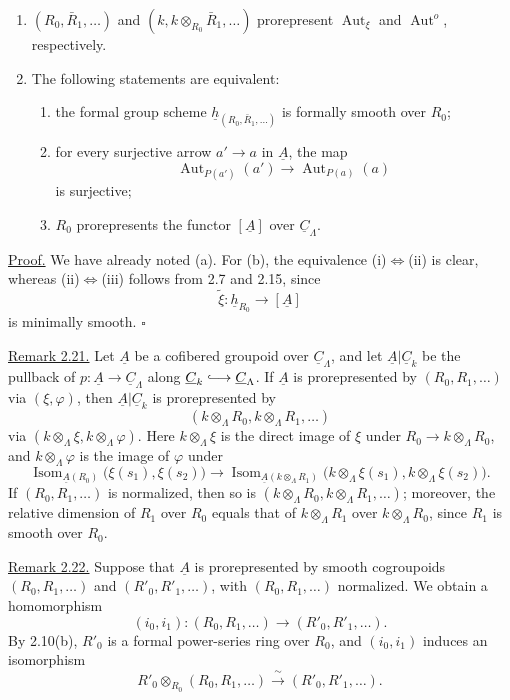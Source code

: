 \begin{enumerate}[label=(\alph*)]
\item $(R_0,\bar R_1,\ldots)$ and
$(k,k\otimes_{R_0}\bar R_1,\ldots)$ prorepresent
$\operatorname{Aut}_\xi$ and $\operatorname{Aut}^{o}$, respectively.

\item The following statements are equivalent:
\begin{enumerate}[label=(\roman*)]
\item the formal group scheme
$\underline h_{(R_0,\bar R_1,\ldots)}$ is formally smooth over $R_0$;
\item for every surjective arrow $a'\longrightarrow a$ in
$\underline A$, the map
\[
 \operatorname{Aut}_{P(a')}(a')\longrightarrow
 \operatorname{Aut}_{P(a)}(a)
\]
is surjective;
\item $R_0$ prorepresents the functor $[\underline A]$ over
$\underline C_\Lambda$.
\end{enumerate}
\end{enumerate}


\underline{Proof.} We have already noted (a). For (b), the
equivalence (i)$\Leftrightarrow$(ii) is clear, whereas
(ii)$\Leftrightarrow$(iii) follows from 2.7 and 2.15, since
\[
 \widetilde\xi:\underline h_{R_0}\longrightarrow[\underline A]
\]
is minimally smooth. \hfill$\square$

\underline{Remark 2.21.} Let $\underline A$ be a cofibered groupoid
over $\underline C_\Lambda$, and let
$\underline A|\underline C_k$ be the pullback of
$p:\underline A\longrightarrow\underline C_\Lambda$ along
$\underline C_k\lhook\joinrel\longrightarrow\underline C_\Lambda$.
If $\underline A$ is prorepresented by $(R_0,R_1,\ldots)$ via
$(\xi,\varphi)$, then $\underline A|\underline C_k$ is
prorepresented by
\[
 (k\otimes_\Lambda R_0,k\otimes_\Lambda R_1,\ldots)
\]
via $(k\otimes_\Lambda\xi,k\otimes_\Lambda\varphi)$. Here
$k\otimes_\Lambda\xi$ is the direct image of $\xi$ under
$R_0\longrightarrow k\otimes_\Lambda R_0$, and
$k\otimes_\Lambda\varphi$ is the image of $\varphi$ under
\[
 \operatorname{Isom}_{\underline A(R_0)}
   \bigl(\xi(s_1),\xi(s_2)\bigr)
 \longrightarrow
 \operatorname{Isom}_{\underline A(k\otimes_\Lambda R_1)}
   \bigl(k\otimes_\Lambda\xi(s_1),
         k\otimes_\Lambda\xi(s_2)\bigr).
\]
If $(R_0,R_1,\ldots)$ is normalized, then so is
$(k\otimes_\Lambda R_0,k\otimes_\Lambda R_1,\ldots)$; moreover, the
relative dimension of $R_1$ over $R_0$ equals that of
$k\otimes_\Lambda R_1$ over $k\otimes_\Lambda R_0$, since $R_1$ is
smooth over $R_0$.

\underline{Remark 2.22.} Suppose that $\underline A$ is
prorepresented by smooth cogroupoids $(R_0,R_1,\ldots)$ and
$(R'_0,R'_1,\ldots)$, with $(R_0,R_1,\ldots)$ normalized. We obtain a
homomorphism
\[
 (i_0,i_1):(R_0,R_1,\ldots)\longrightarrow(R'_0,R'_1,\ldots).
\]
By 2.10(b), $R'_0$ is a formal power-series ring over $R_0$, and
$(i_0,i_1)$ induces an isomorphism
\[
 R'_0\otimes_{R_0}(R_0,R_1,\ldots)
 \xrightarrow{\ \sim\ }(R'_0,R'_1,\ldots).
\]
